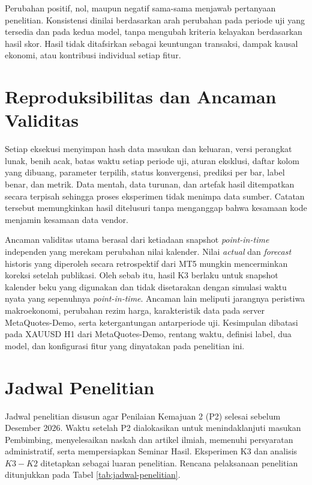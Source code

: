 Perubahan positif, nol, maupun negatif sama-sama menjawab pertanyaan penelitian. Konsistensi dinilai berdasarkan arah perubahan pada periode uji yang tersedia dan pada kedua model, tanpa mengubah kriteria kelayakan berdasarkan hasil skor. Hasil tidak ditafsirkan sebagai keuntungan transaksi, dampak kausal ekonomi, atau kontribusi individual setiap fitur.

\section{Reproduksibilitas dan Ancaman Validitas}

Setiap eksekusi menyimpan hash data masukan dan keluaran, versi perangkat lunak, benih acak, batas waktu setiap periode uji, aturan eksklusi, daftar kolom yang dibuang, parameter terpilih, status konvergensi, prediksi per bar, label benar, dan metrik. Data mentah, data turunan, dan artefak hasil ditempatkan secara terpisah sehingga proses eksperimen tidak menimpa data sumber. Catatan tersebut memungkinkan hasil ditelusuri tanpa menganggap bahwa kesamaan kode menjamin kesamaan data vendor.

Ancaman validitas utama berasal dari ketiadaan snapshot \emph{point-in-time} independen yang merekam perubahan nilai kalender. Nilai \emph{actual} dan \emph{forecast} historis yang diperoleh secara retrospektif dari MT5 mungkin mencerminkan koreksi setelah publikasi. Oleh sebab itu, hasil K3 berlaku untuk snapshot kalender beku yang digunakan dan tidak disetarakan dengan simulasi waktu nyata yang sepenuhnya \emph{point-in-time}. Ancaman lain meliputi jarangnya peristiwa makroekonomi, perubahan rezim harga, karakteristik data pada server MetaQuotes-Demo, serta ketergantungan antarperiode uji. Kesimpulan dibatasi pada XAUUSD H1 dari MetaQuotes-Demo, rentang waktu, definisi label, dua model, dan konfigurasi fitur yang dinyatakan pada penelitian ini.

\section{Jadwal Penelitian}

Jadwal penelitian disusun agar Penilaian Kemajuan 2 (P2) selesai sebelum Desember 2026. Waktu setelah P2 dialokasikan untuk menindaklanjuti masukan Pembimbing, menyelesaikan naskah dan artikel ilmiah, memenuhi persyaratan administratif, serta mempersiapkan Seminar Hasil. Eksperimen K3 dan analisis $K3-K2$ ditetapkan sebagai luaran penelitian. Rencana pelaksanaan penelitian ditunjukkan pada Tabel \ref{tab:jadwal-penelitian}.

